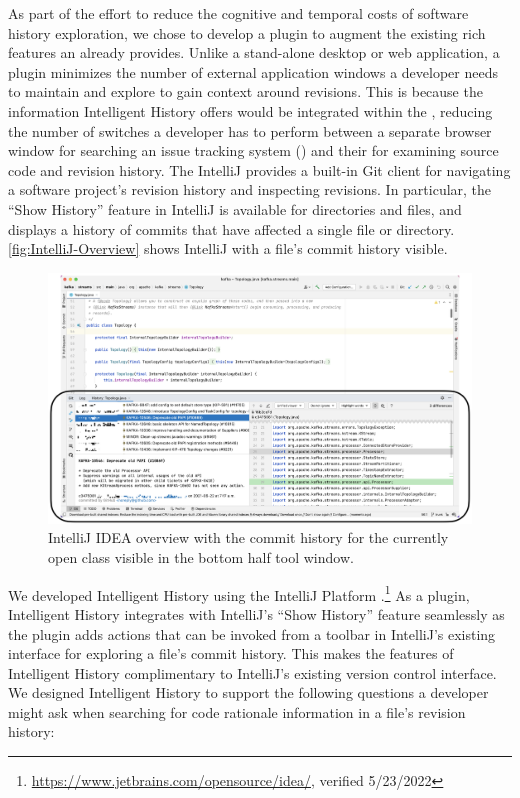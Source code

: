 As part of the effort to reduce the cognitive and temporal costs of software history exploration, we chose to develop a plugin to augment the existing rich features an  already provides.
Unlike a stand-alone desktop or web application, a plugin minimizes the number of external application windows a developer needs to maintain and explore to gain context around revisions. 
This is because the information Intelligent History offers would be integrated within the , reducing the number of switches a developer has to perform between a separate browser window for searching an issue tracking system () and their  for examining source code and revision history.
The IntelliJ  provides a built-in Git client  for navigating a software project's revision history and inspecting revisions. 
In particular, the ``Show History'' feature in IntelliJ is available for directories and files, and displays a history of commits that have affected a single file or directory.
\autoref{fig:IntelliJ-Overview} shows IntelliJ with a file's commit history visible.

\begin{figure}[ht]
    \includegraphics[width=\textwidth]{./images/intellij-overview.png}
    \caption{
        IntelliJ IDEA overview with the commit history for the currently open  class visible in the bottom half tool window.
    }
    \label{fig:IntelliJ-Overview}
\end{figure}

We developed Intelligent History using the IntelliJ Platform .\footnote{\url{https://www.jetbrains.com/opensource/idea/}, verified 5/23/2022}
As a plugin, Intelligent History integrates with IntelliJ's ``Show History'' feature seamlessly as the plugin adds actions that can be invoked from a toolbar in IntelliJ's existing interface for exploring a file's commit history. 
This makes the features of Intelligent History complimentary to IntelliJ's existing version control interface.
We designed Intelligent History to support the following questions a developer might ask when searching for code rationale information in a file's revision history:

